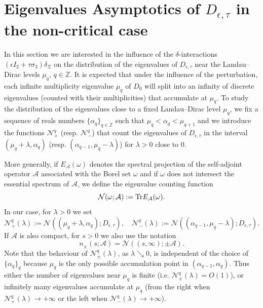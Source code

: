 \documentclass[11pt,a4paper,reqno,oneside]{amsproc}
\def \zz {{\mathbb Z}}
\numberwithin{equation}{section}
\begin{document}
\section{Eigenvalues Asymptotics of $D_{\epsilon,\tau}$ in the non-critical case}\label{S5}



In this section we are interested in the influence of the $\delta$-interactions $(\epsilon I_2 + \tau \sigma_3)\delta_\Sigma$ on the distribution of the eigenvalues of $D_{\epsilon,\tau}$  near the Landau--Dirac levels $\mu_q$, $q \in \zz$. It is expected that under the influence of the perturbation, each infinite multiplicity eigenvalue $\mu_q$ of  $D_0$ will split into an infinity of discrete eigenvalues (counted with their multiplicities) that accumulate at $\mu_q$. To study the distribution of the eigenvalues close to a fixed Landau--Dirac level $\mu_q$, we fix a sequence of reals numbers $\{\alpha_q\}_{q\in \zz}$ such that $ \mu_q < \alpha_q  < \mu_{q+1}$  and we introduce the functions $ {\mathcal N}_{+}^q$ (resp.  ${\mathcal N}_{-}^q$) that count the eigenvalues of $D_{\epsilon,\tau}$ in the interval $(\mu_q + \lambda, \alpha_q)$ (resp. $(\alpha_{q-1}, \mu_q - \lambda)$) for $\lambda >0$ close to $0$. 

More generally, if  $E_{\mathcal A}(\omega)$ denotes the spectral projection of the self-adjoint operator $\mathcal A$  associated with the Borel set $\omega$ and if $\omega$ does not intersect the essential spectrum of $\mathcal A$, we define the eigenvalue counting function 
\[
\mathcal N(\omega; \mathcal A):= {\rm Tr}E_{\mathcal A}(\omega).
\]
In our case, for $\lambda >0$ we set
 \[
 {\mathcal N}_{+}^q(\lambda):=\mathcal N((\mu_q + \lambda, \alpha_q); D_{\epsilon,\tau}),\quad  {\mathcal N}_{-}^q(\lambda):=\mathcal N((\alpha_{q-1},\mu_q-\lambda); D_{\epsilon,\tau}).
 \]
If $\mathcal A$ is also compact, for $s>0$  we also use the notation  
 \[
 n_\pm(s;\mathcal A)=\mathcal N((s,\infty); \pm \mathcal A).
 \]
Note that the behaviour of ${\mathcal N}_{\pm}^q(\lambda)$, as $\lambda \searrow 0$, is independent of the choice of $\{\alpha_q\}_q$ because $\mu_q$ is the only possible accumulation point in $(\alpha_{q-1}, \alpha_q)$. Thus either the number of eigenvalues near $\mu_q$ is finite (i.e. ${\mathcal N}_{\pm}^q(\lambda)=O(1)$), or  infinitely many eigenvalues accumulate at $\mu_q$ (from the right when ${\mathcal N}_{+}^q(\lambda) \rightarrow + \infty$ or the left when ${\mathcal N}_{-}^q(\lambda) \rightarrow + \infty$).
\end{document}
